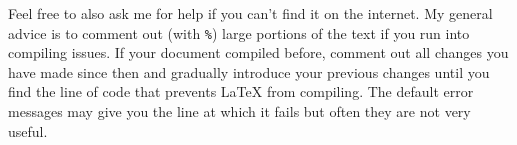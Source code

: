 Feel free to also ask me for help if you can't find it on the internet. My general advice is to comment out (with \verb|%|) large portions of the text if you run into compiling issues. If your document compiled before, comment out all changes you have made since then and gradually introduce your previous changes until you find the line of code that prevents \LaTeX{} from compiling. The default error messages may give you the line at which it fails but often they are not very useful.